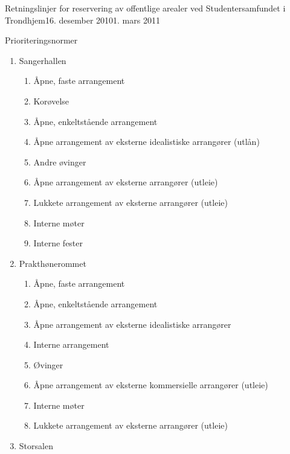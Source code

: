 \begin{instruks}{Retningslinjer for reservering av offentlige arealer
    ved Studentersamfundet i Trondhjem}{16. desember 2010}{1. mars 2011}
\begin{instruksledd}{Prioriteringsnormer}
\begin{enumerate}
\begin{enumerate}
\begin{enumerate}
                            \item Lukkete arrangementer av eksterne arrangører (utleie)
                            \item Interne fester
                        \end{enumerate}
                    \item Sangerhallen
                        \begin{enumerate}
                            \item  Åpne, faste arrangement
                            \item Korøvelse
                            \item  Åpne, enkeltstående arrangement
                            \item Åpne arrangement av eksterne idealistiske arrangører (utlån)
                            \item Andre øvinger
                            \item Åpne arrangement av eksterne arrangører (utleie)
                            \item Lukkete arrangement av eksterne arrangører (utleie)
                            \item Interne møter
                            \item Interne fester
                        \end{enumerate}
                    \item Prakthønerommet
                        \begin{enumerate}
                            \item Åpne, faste arrangement
                            \item Åpne, enkeltstående arrangement
                            \item Åpne arrangement av eksterne idealistiske arrangører
                            \item Interne arrangement
                            \item Øvinger
                            \item Åpne arrangement av eksterne kommersielle arrangører (utleie)
                            \item Interne møter
                            \item Lukkete arrangement av eksterne arrangører (utleie)
                        \end{enumerate}
                    \item Storsalen

\end{enumerate}
\end{enumerate}
\end{instruksledd}
\end{instruks}
